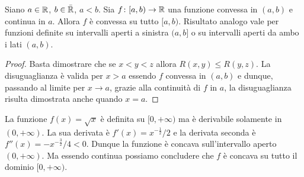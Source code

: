 \begin{theorem}
Siano $a\in {\mathbb R}$, $b\in \bar {{\mathbb R}}$, $a<b$.
Sia $f\colon [a,b)\to {\mathbb R}$ una funzione convessa 
in $(a,b)$ e continua in $a$. 
Allora $f$ è convessa su tutto $[a,b)$. 
Risultato analogo vale per funzioni definite su 
intervalli aperti a sinistra $(a,b]$
o su intervalli aperti da ambo i lati $(a,b)$.
\end{theorem}
%
\begin{proof}
Basta dimostrare che se $x<y<z$ allora $R(x,y)\le R(y,z)$.
La disuguaglianza è valida per $x>a$ essendo $f$ convessa 
in $(a,b)$ e dunque, passando al limite per $x\to a$, 
grazie alla continuità di $f$ in $a$,
la disuguaglianza risulta dimostrata anche quando $x=a$.
\end{proof}

\begin{example}
La funzione $f(x) = \sqrt{x}$ è definita su $[0,+\infty)$ ma è derivabile solamente in $(0,+\infty)$. La sua derivata è $f'(x) = x^{-\frac 1 2 }/2$ e la derivata seconda è $f''(x) = -x^{-\frac 3 2}/4 < 0$. Dunque la funzione è concava sull'intervallo aperto $(0,+\infty)$. Ma essendo continua possiamo concludere che $f$ è concava su tutto il dominio $[0,+\infty)$.
\end{example}

